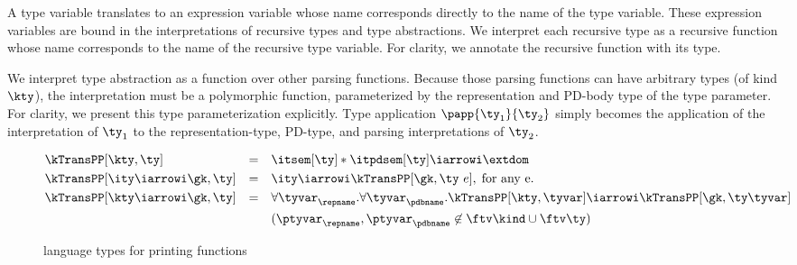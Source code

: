 A type variable translates to an expression variable whose name
corresponds directly to the name of the type variable. These
expression variables are bound in the interpretations of recursive
types and type abstractions. We interpret each recursive type as a
recursive function whose name corresponds to the name of the recursive
type variable. For clarity, we annotate the recursive function with its
type.

We interpret type abstraction as a function over other parsing
functions. Because those parsing functions can have
arbitrary \ddc{} types (of kind $\kty$), the interpretation must be a
polymorphic function, parameterized by the representation and PD-body
type of the \ddc{} type parameter.  For clarity, we present
this type parameterization explicitly.  Type application $\papp
{\ty_1}{\ty_2}$ simply becomes the application of the interpretation
of $\ty_1$ to the representation-type, PD-type, and parsing
interpretations of $\ty_2$.



\begin{figure}
\small
\fbox{$\kTransPP[\gk,\ty] = \ity$} 
    
\begin{align*}
  &\kTransPP[\kty,\ty] & = & \quad \itsem[\ty] * \itpdsem[\ty] \iarrowi \extdom 
   \\
   &\kTransPP[\ity \iarrowi \gk,\ty] & = & \quad \ity \iarrowi \kTransPP[\gk,\ty\ e],
   \; \mbox{for any e}.
   \\
   &\kTransPP[\kty \iarrowi \gk,\ty] & = & \quad 
      \forall\tyvar_\repname.\forall\tyvar_\pdbname.
         \kTransPP[\kty,\tyvar] \iarrowi \kTransPP[\gk,\ty \tyvar] \\
         & & & \quad (\ptyvar_\repname, \ptyvar_\pdbname \not \in \ftv \kind \cup
         \ftv \ty)
\end{align*}  
  \caption{\Implang{} language types for printing functions}
  \label{fig:printer-types}
\end{figure}

